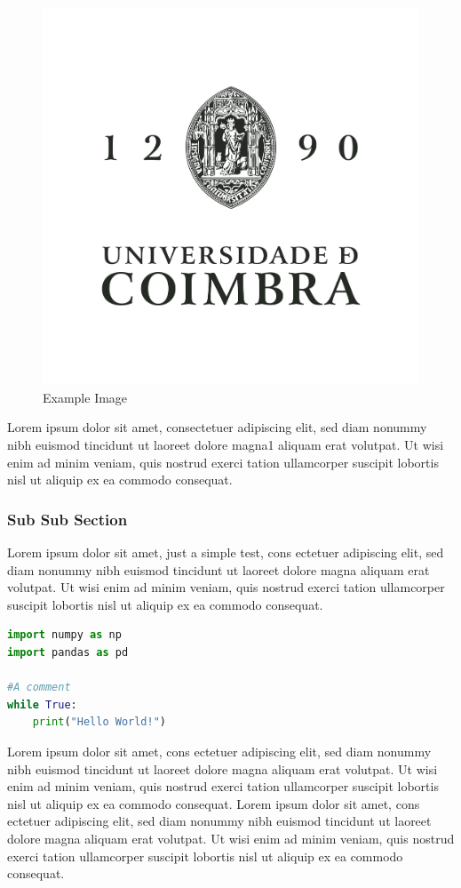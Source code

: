\begin{figure}[H]
    \centering
    \includegraphics[width=0.5\linewidth]{images/UC_logos/UC_V_FundoClaro-negro.png}
    \caption{Example Image \cite{ExampleArticle}
    }
    \label{fig: sample image}
\end{figure}

Lorem ipsum dolor sit amet, consectetuer adipiscing elit, sed diam nonummy nibh euismod tincidunt ut laoreet dolore magna1 aliquam erat volutpat. Ut wisi enim ad minim veniam, quis nostrud exerci tation ullamcorper suscipit lobortis nisl ut aliquip ex ea commodo consequat.


\subsubsection{Sub Sub Section}

Lorem ipsum dolor sit amet, just a simple test, cons ectetuer adipiscing elit, sed diam nonummy nibh euismod tincidunt ut laoreet dolore magna aliquam erat volutpat. Ut wisi enim ad minim veniam, quis nostrud exerci tation ullamcorper suscipit lobortis nisl ut aliquip ex ea commodo consequat.


\begin{lstlisting}[language=Python, caption= Sample code listing, label=lst: sample code,frame=tb]
import numpy as np
import pandas as pd

#A comment
while True:
    print("Hello World!")
\end{lstlisting}

Lorem ipsum dolor sit amet, cons ectetuer adipiscing elit, sed diam nonummy nibh euismod tincidunt ut laoreet dolore magna aliquam erat volutpat. Ut wisi enim ad minim veniam, quis nostrud exerci tation ullamcorper suscipit lobortis nisl ut aliquip ex ea commodo consequat.
Lorem ipsum dolor sit amet, cons ectetuer adipiscing elit, sed diam nonummy nibh euismod tincidunt ut laoreet dolore magna aliquam erat volutpat. Ut wisi enim ad minim veniam, quis nostrud exerci tation ullamcorper suscipit lobortis nisl ut aliquip ex ea commodo consequat.